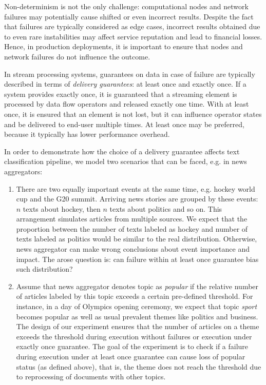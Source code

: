 Non-determinism is not the only challenge: computational nodes and network failures may potentially cause shifted or even incorrect results. Despite the fact that failures are typically considered as edge cases, incorrect results obtained due to even rare instabilities may affect service reputation and lead to financial losses. Hence, in production deployments, it is important to ensure that nodes and network failures do not influence the outcome.

In stream processing systems, guarantees on data in case of failure are typically described in terms of {\em delivery guarantees}: at least once and exactly once. If a system provides exactly once, it is guaranteed that a streaming element is processed by data flow operators and released exactly one time. With at least once, it is ensured that an element is not lost, but it can influence operator states and be delivered to end-user multiple times. At least once may be preferred, because it typically has lower performance overhead.

In order to demonstrate how the choice of a delivery guarantee affects text classification pipeline, we model two scenarios that can be faced, e.g. in news aggregators:
\begin{enumerate}
    \item There are two equally important events at the same time, e.g. hockey world cup and the G20 summit. Arriving news stories are grouped by these events: $n$ texts about hockey, then $n$ texts about politics and so on. This arrangement simulates articles from multiple sources. We expect that the proportion between the number of texts labeled as hockey and number of texts labeled as politics would be similar to the real distribution. Otherwise, news aggregator can make wrong conclusions about event importance and impact. The arose question is: can failure within at least once guarantee bias such distribution?
    \item Assume that news aggregator denotes topic as {\em popular} if the relative number of articles labeled by this topic exceeds a certain pre-defined threshold. For instance, in a day of Olympics opening ceremony, we expect that topic {\em sport} becomes popular as well as usual prevalent themes like politics and business. The design of our experiment ensures that the number of articles on a theme exceeds the threshold during execution without failures or execution under exactly once guarantee. The goal of the experiment is to check if a failure during execution under at least once guarantee can cause loss of popular status (as defined above), that is, the theme does not reach the threshold due to reprocessing of documents with other topics. 
\end{enumerate}


